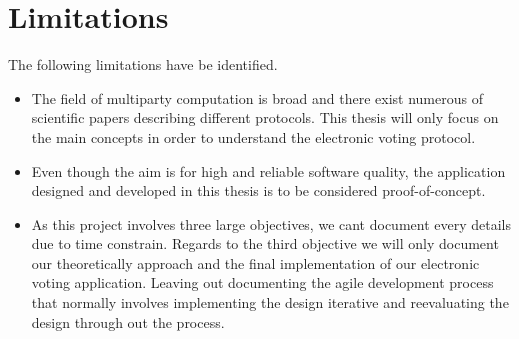 \section{Limitations}

The following limitations have be identified.

\begin{itemize}
    \item The field of multiparty computation is broad and there exist numerous of scientific papers describing different protocols. This thesis will only focus on the main concepts in order to understand the electronic voting protocol. 
    
    \item Even though the aim is for high and reliable software quality, the application designed and developed in this thesis is to be considered proof-of-concept. 
    \item As this project involves three large objectives, we cant document every details due to time constrain. Regards to the third objective we will only document our theoretically approach and the final implementation of our electronic voting application. Leaving out documenting the agile development process that normally involves implementing the design iterative and reevaluating the design through out the process.
\end{itemize}